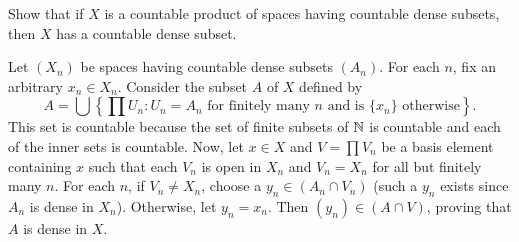 	\begin{exercise}
		Show that if $X$ is a countable product of spaces having countable dense subsets, then $X$ has a countable dense subset.
	\end{exercise}
	\begin{solution*}
		Let $(X_n)$ be spaces having countable dense subsets $(A_n)$. For each $n$, fix an arbitrary $x_n \in X_n$. Consider the subset $A$ of $X$ defined by
		\[ A = \bigcup \left\{ \prod U_n : U_n=A_n \text{ for finitely many $n$ and is $\{x_n\}$ otherwise} \right\}. \]
		This set is countable because the set of finite subsets of $\mathbb{N}$ is countable and each of the inner sets is countable. Now, let $x \in X$ and $V = \prod V_n$ be a basis element containing $x$ such that each $V_n$ is open in $X_n$ and $V_n = X_n$ for all but finitely many $n$. For each $n$, if $V_n \neq X_n$, choose a $y_n \in (A_n \cap V_n)$ (such a $y_n$ exists since $A_n$ is dense in $X_n$). Otherwise, let $y_n = x_n$. Then $(y_n) \in (A \cap V)$, proving that $A$ is dense in $X$.
	\end{solution*}



